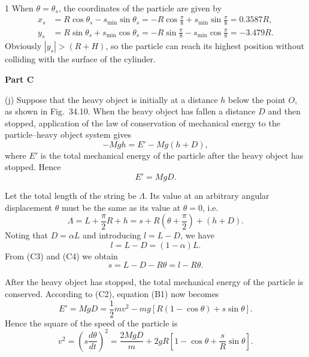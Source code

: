\begin{solution}{1}
When $\theta=\theta_s$, the coordinates of the particle are given by
\begin{equation}
\begin{aligned}
x_s&=R\cos\theta_s-s_{\min}\sin\theta_s=-R\cos\frac{\pi}{8}+s_{\min}\sin\frac{\pi}{8}=0.3587R,\\
y_s&=R\sin\theta_s+s_{\min}\cos\theta_s=-R\sin\frac{\pi}{8}-s_{\min}\cos\frac{\pi}{8}=-3.479R.
\end{aligned}\tag{B12}
\end{equation}
Obviously $|y_s|>(R+H)$, so the particle can reach its highest position without colliding with the surface of the cylinder.

\textbf{Part C}

(j) Suppose that the heavy object is initially at a distance $h$ below the point $O$, as shown in Fig.~34.10. When the heavy object has fallen a distance $D$ and then stopped, application of the law of conservation of mechanical energy to the particle--heavy object system gives
\begin{equation}
-Mgh=E'-Mg(h+D), \tag{C1}
\end{equation}
where $E'$ is the total mechanical energy of the particle after the heavy object has stopped. Hence
\begin{equation}
E'=MgD . \tag{C2}
\end{equation}

Let the total length of the string be $\Lambda$. Its value at an arbitrary angular displacement $\theta$ must be the same as its value at $\theta=0$, i.e.
\begin{equation}
\Lambda=L+\frac{\pi}{2}R+h=s+R\left(\theta+\frac{\pi}{2}\right)+(h+D). \tag{C3}
\end{equation}
Noting that $D=\alpha L$ and introducing $l=L-D$, we have
\begin{equation}
l=L-D=(1-\alpha)L . \tag{C4}
\end{equation}
From (C3) and (C4) we obtain
\begin{equation}
s=L-D-R\theta=l-R\theta . \tag{C5}
\end{equation}

After the heavy object has stopped, the total mechanical energy of the particle is conserved. According to (C2), equation (B1) now becomes
\begin{equation}
E'=MgD=\frac{1}{2}mv^2-mg\left[R(1-\cos\theta)+s\sin\theta\right]. \tag{C6}
\end{equation}
Hence the square of the speed of the particle is
\begin{equation}
v^2=\left(s\frac{d\theta}{dt}\right)^2=\frac{2MgD}{m}+2gR\left[1-\cos\theta+\frac{s}{R}\sin\theta\right]. \tag{C7}
\end{equation}


\end{solution}
